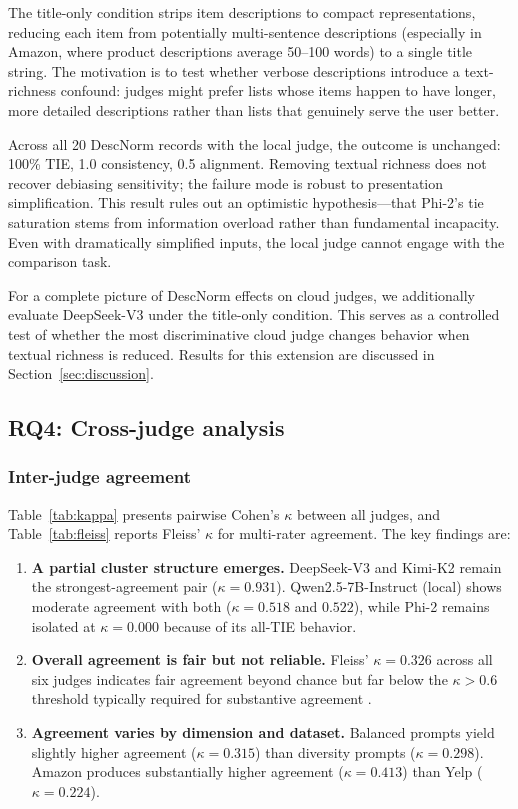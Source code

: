 \documentclass[pdflatex,sn-basic,referee,lineno]{sn-jnl}
\begin{document}
The title-only condition strips item descriptions to compact representations, reducing each item from potentially multi-sentence descriptions (especially in Amazon, where product descriptions average 50--100 words) to a single title string. The motivation is to test whether verbose descriptions introduce a text-richness confound: judges might prefer lists whose items happen to have longer, more detailed descriptions rather than lists that genuinely serve the user better.

Across all 20 DescNorm records with the local judge, the outcome is unchanged: 100\% TIE, 1.0 consistency, 0.5 alignment. Removing textual richness does not recover debiasing sensitivity; the failure mode is robust to presentation simplification. This result rules out an optimistic hypothesis---that Phi-2's tie saturation stems from information overload rather than fundamental incapacity. Even with dramatically simplified inputs, the local judge cannot engage with the comparison task.

For a complete picture of DescNorm effects on cloud judges, we additionally evaluate DeepSeek-V3 under the title-only condition. This serves as a controlled test of whether the most discriminative cloud judge changes behavior when textual richness is reduced. Results for this extension are discussed in Section~\ref{sec:discussion}.

\subsection{RQ4: Cross-judge analysis}

\subsubsection{Inter-judge agreement}

Table~\ref{tab:kappa} presents pairwise Cohen's $\kappa$ between all judges, and Table~\ref{tab:fleiss} reports Fleiss' $\kappa$ for multi-rater agreement. The key findings are:

\begin{enumerate}
\item \textbf{A partial cluster structure emerges.} DeepSeek-V3 and Kimi-K2 remain the strongest-agreement pair ($\kappa = 0.931$). Qwen2.5-7B-Instruct (local) shows moderate agreement with both ($\kappa = 0.518$ and $0.522$), while Phi-2 remains isolated at $\kappa = 0.000$ because of its all-TIE behavior.
\item \textbf{Overall agreement is fair but not reliable.} Fleiss' $\kappa = 0.326$ across all six judges indicates fair agreement beyond chance but far below the $\kappa > 0.6$ threshold typically required for substantive agreement \citep{fleiss1971kappa}.
\item \textbf{Agreement varies by dimension and dataset.} Balanced prompts yield slightly higher agreement ($\kappa = 0.315$) than diversity prompts ($\kappa = 0.298$). Amazon produces substantially higher agreement ($\kappa = 0.413$) than Yelp ($\kappa = 0.224$).
\end{enumerate}
\end{document}
